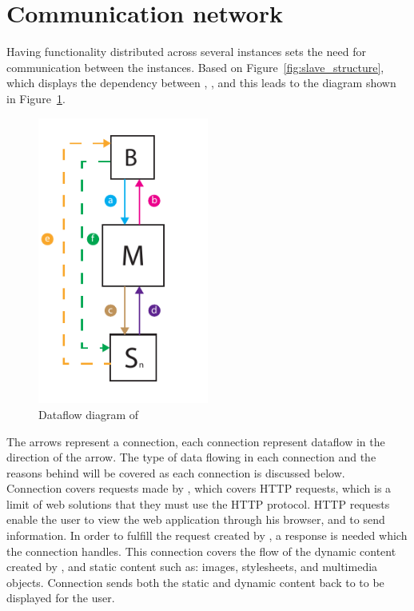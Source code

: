 \section{Communication network}

Having functionality distributed across several instances sets the need for communication between the instances.
Based on Figure~\ref{fig:slave_structure}, which displays the dependency between , , and  this leads to the diagram shown in Figure~\ref{fig:dataflow_diagrem}. \\


\begin{figure}[!h]
    \centering 
    \includegraphics[width=0.5\textwidth]{gfx/dataflow_diagram.pdf}
    \caption{Dataflow diagram of \projectname{}}
    \label{fig:dataflow_diagrem}
\end{figure}


The arrows represent a connection, each connection represent dataflow in the direction of the arrow.
The type of data flowing in each connection and the reasons behind will be covered as each connection is discussed below. \\

Connection  covers requests made by , which covers HTTP requests, which is a limit of web solutions that they must use the HTTP protocol.
HTTP requests enable the user to view the web application through his browser, and to send information.
In order to fulfill the request created by , a response is needed which the connection  handles.
This connection covers the flow of the dynamic content created by , and static content such as: images, stylesheets, and multimedia objects.
Connection  sends both the static and dynamic content back to  to be displayed for the user. \\

